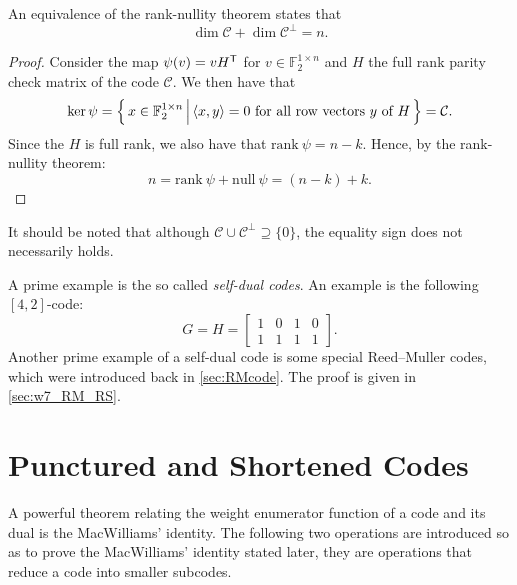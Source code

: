 \begin{theorem} 
    An equivalence of the rank-nullity theorem states that
    \begin{equation}
        \dim\mathcal{C} + \dim\mathcal{C}^\perp = n. \label{eq:rank-nullity}
    \end{equation}
\end{theorem}
\begin{proof}
    Consider the map $\psi(v)=vH^{\mathsf{T}}$ for $v\in\mathbb{F}_2^{1\times n}$ and $H$ the full rank parity check matrix of the code $\mathcal{C}$. We then have that
    \begin{equation*}
        \ker\psi = \left\{\,{x\in\mathbb{F}_2^{1\times n}}\,\middle\vert\,{\langle x,y\rangle=0 \text{ for all row vectors }y \text{ of }H}\,\right\} = \mathcal{C}.
    \end{equation*}
    Since the $H$ is full rank, we also have that $\mathrm{rank}~\psi=n-k$. Hence, by the rank-nullity theorem:
    \begin{equation*}
        n = \mathrm{rank}~\psi + \mathrm{null}~\psi = (n-k) + k.
    \end{equation*}
\end{proof}

\begin{remark} \label{rmk:w6_RM_self_dual}
    It should be noted that although $\mathcal{C}\cup \mathcal{C}^\perp \supseteq \{0\}$, the equality sign does not necessarily holds.

    A prime example is the so called \textit{self-dual codes}. An example is the following $[4,2]$-code:
    \begin{equation*}
        G = H = \left[\begin{matrix}
            1 & 0 & 1 & 0 \\ 1 & 1 & 1 & 1
        \end{matrix}\right].
    \end{equation*}
    Another prime example of a self-dual code is some special Reed--Muller codes, which were introduced back in \autoref{sec:RMcode}. The proof is given in \autoref{sec:w7_RM_RS}.
\end{remark}

\section{Punctured and Shortened Codes}
A powerful theorem relating the weight enumerator function of a code and its dual is the MacWilliams' identity. The following two operations are introduced so as to prove the MacWilliams' identity stated later, they are operations that reduce a code into smaller subcodes.

